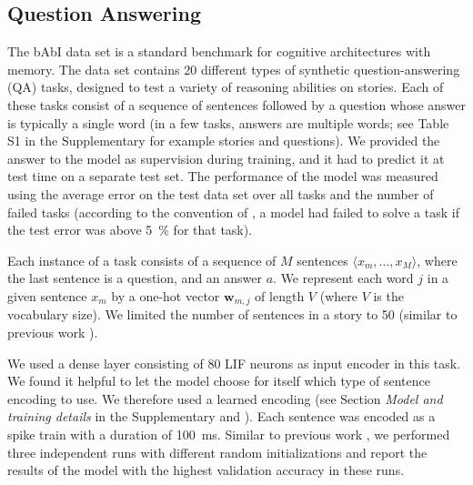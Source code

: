\documentclass{article}
\newcommand{\vm}[1]{\bm{#1}}
\begin{document}
\subsection{Question Answering}
\label{sec:results-babi}
The bAbI data set \cite{weston2015towards} is a standard benchmark for cognitive architectures with memory. The data set contains \num{20} different types of synthetic question-answering (QA) tasks, designed to test a variety of reasoning abilities on stories. Each of these tasks consist of a sequence of sentences followed by a question whose answer is typically a single word (in a few tasks, answers are multiple words; see Table S1 in the Supplementary for example stories and questions). We provided the answer to the model as supervision during training, and it had to predict it at test time on a separate test set. The performance of the model was measured using the average error on the test data set over all tasks and the number of failed tasks (according to the convention of \cite{weston2015towards}, a model had failed to solve a task if the test error was above \SI{5}{\percent} for that task).

Each instance of a task consists of a sequence of $M$ sentences $\langle x_m, \dots, x_M\rangle$, where the last sentence is a question, and an answer $a$. We represent each word $j$ in a given sentence $x_m$ by a one-hot vector $\vm{w}_{m,j}$ of length $V$ (where $V$ is the vocabulary size). We limited the number of sentences in a story to \num{50} (similar to previous work \cite{sukhbaatar2015end,henaff2017tracking}).

We used a dense layer consisting of \num{80} \gls{LIF} neurons as input encoder in this task. We found it helpful to let the model choose for itself which type of sentence encoding to use. We therefore used a learned encoding (see Section \emph{Model and training details} in the Supplementary and \cite{henaff2017tracking}). Each sentence was encoded as a spike train with a duration of \SI{100}{ms}. Similar to previous work \cite{sukhbaatar2015end,henaff2017tracking}, we performed three independent runs with different random initializations and report the results of the model with the highest validation accuracy in these runs.
\end{document}
